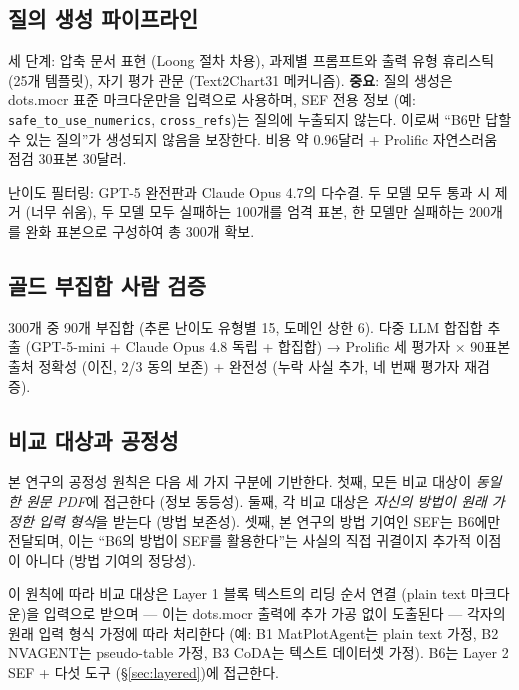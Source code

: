 \documentclass[11pt]{article}
\begin{document}
\subsection{질의 생성 파이프라인}
\label{sec:querygen}

세 단계: 압축 문서 표현 (Loong 절차 차용), 과제별 프롬프트와 출력 유형 휴리스틱 (25개 템플릿), 자기 평가 관문 (Text2Chart31 메커니즘). \textbf{중요}: 질의 생성은 dots.mocr 표준 마크다운만을 입력으로 사용하며, SEF 전용 정보 (예: \texttt{safe\_to\_use\_numerics}, \texttt{cross\_refs})는 질의에 누출되지 않는다. 이로써 ``B6만 답할 수 있는 질의''가 생성되지 않음을 보장한다. 비용 약 0.96달러 + Prolific 자연스러움 점검 30표본 30달러.

난이도 필터링: GPT-5 완전판과 Claude Opus 4.7의 다수결. 두 모델 모두 통과 시 제거 (너무 쉬움), 두 모델 모두 실패하는 100개를 엄격 표본, 한 모델만 실패하는 200개를 완화 표본으로 구성하여 총 300개 확보.

\subsection{골드 부집합 사람 검증}

300개 중 90개 부집합 (추론 난이도 유형별 15, 도메인 상한 6). 다중 LLM 합집합 추출 (GPT-5-mini + Claude Opus 4.8 독립 + 합집합) → Prolific 세 평가자 × 90표본 출처 정확성 (이진, 2/3 동의 보존) + 완전성 (누락 사실 추가, 네 번째 평가자 재검증).

\subsection{비교 대상과 공정성}
\label{sec:fairness}

본 연구의 공정성 원칙은 다음 세 가지 구분에 기반한다. 첫째, 모든 비교 대상이 \emph{동일한 원문 PDF}에 접근한다 (정보 동등성). 둘째, 각 비교 대상은 \emph{자신의 방법이 원래 가정한 입력 형식}을 받는다 (방법 보존성). 셋째, 본 연구의 방법 기여인 SEF는 B6에만 전달되며, 이는 ``B6의 방법이 SEF를 활용한다''는 사실의 직접 귀결이지 추가적 이점이 아니다 (방법 기여의 정당성).

이 원칙에 따라 비교 대상은 Layer 1 블록 텍스트의 리딩 순서 연결 (plain text 마크다운)을 입력으로 받으며 — 이는 dots.mocr 출력에 추가 가공 없이 도출된다 — 각자의 원래 입력 형식 가정에 따라 처리한다 (예: B1 MatPlotAgent는 plain text 가정, B2 NVAGENT는 pseudo-table 가정, B3 CoDA는 텍스트 데이터셋 가정). B6는 Layer 2 SEF + 다섯 도구 (\S\ref{sec:layered})에 접근한다.
\end{document}

